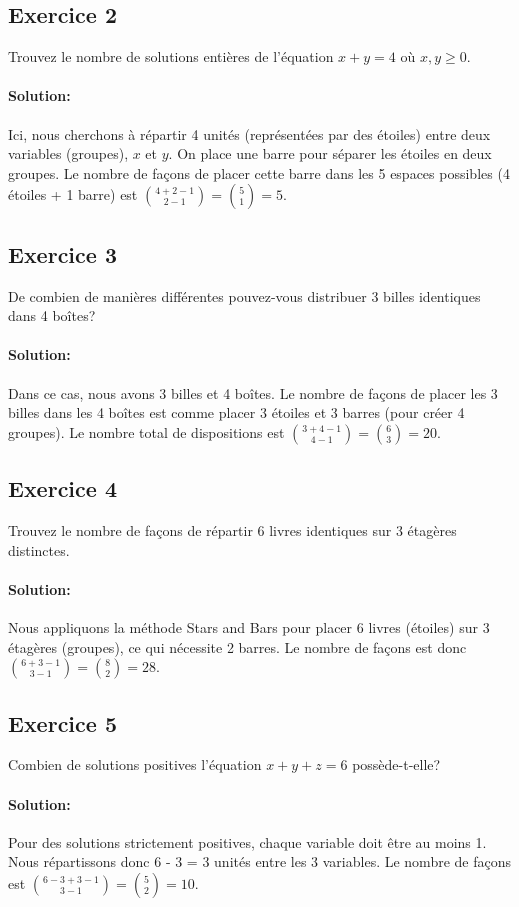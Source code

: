 \documentclass{article}
\begin{document}
\subsection{Exercice 2}
Trouvez le nombre de solutions entières de l'équation \( x + y = 4 \) où \( x, y \geq 0 \).
\paragraph{Solution:}
Ici, nous cherchons à répartir 4 unités (représentées par des étoiles) entre deux variables (groupes), \(x\) et \(y\). On place une barre pour séparer les étoiles en deux groupes. Le nombre de façons de placer cette barre dans les 5 espaces possibles (4 étoiles + 1 barre) est \(\binom{4 + 2 - 1}{2 - 1} = \binom{5}{1} = 5\).

\subsection{Exercice 3}
De combien de manières différentes pouvez-vous distribuer 3 billes identiques dans 4 boîtes?
\paragraph{Solution:}
Dans ce cas, nous avons 3 billes et 4 boîtes. Le nombre de façons de placer les 3 billes dans les 4 boîtes est comme placer 3 étoiles et 3 barres (pour créer 4 groupes). Le nombre total de dispositions est \(\binom{3 + 4 - 1}{4 - 1} = \binom{6}{3} = 20\).

\subsection{Exercice 4}
Trouvez le nombre de façons de répartir 6 livres identiques sur 3 étagères distinctes.
\paragraph{Solution:}
Nous appliquons la méthode Stars and Bars pour placer 6 livres (étoiles) sur 3 étagères (groupes), ce qui nécessite 2 barres. Le nombre de façons est donc \(\binom{6 + 3 - 1}{3 - 1} = \binom{8}{2} = 28\).

\subsection{Exercice 5}
Combien de solutions positives l'équation \( x + y + z = 6 \) possède-t-elle?
\paragraph{Solution:}
Pour des solutions strictement positives, chaque variable doit être au moins 1. Nous répartissons donc 6 - 3 = 3 unités entre les 3 variables. Le nombre de façons est \(\binom{6 - 3 + 3 - 1}{3 - 1} = \binom{5}{2} = 10\).
\end{document}
